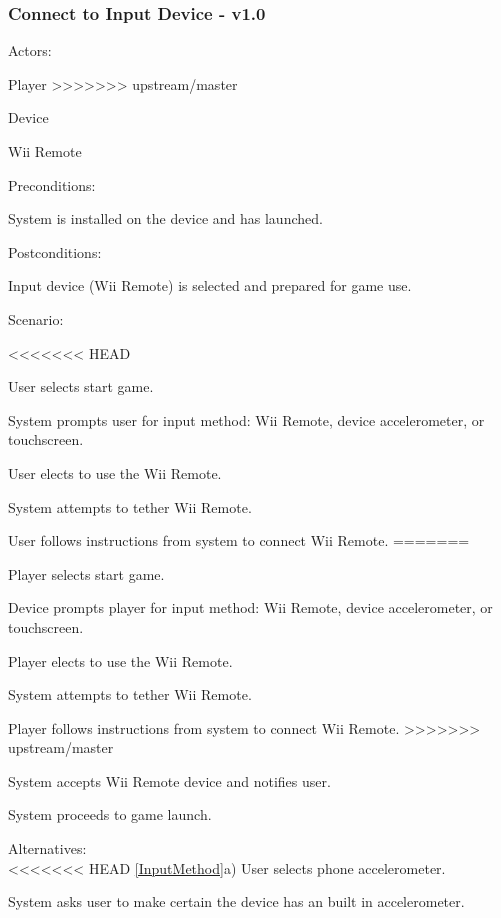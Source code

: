 \documentclass[12pt]{article}
\newenvironment{itemize*}%
  {\begin{itemize}%
  	\setlength{\parsep}{0pt}
    \setlength{\itemsep}{0pt}%
    \setlength{\parskip}{0pt}}%
  {\end{itemize}}
\newenvironment{enumerate*}%
  {\begin{enumerate}%
  	\setlength{\parsep}{0pt}
    \setlength{\itemsep}{0pt}%
    \setlength{\parskip}{0pt}}%
  {\end{enumerate}}
\begin{document}
\begin{itemize*}
\begin{itemize*}
\subsubsection*{Connect to Input Device - v1.0}
Actors:
\begin{itemize*}
\item Player
>>>>>>> upstream/master
\item Device 
\item Wii Remote
\end{itemize*}
Preconditions:
\begin{itemize*}
\item System is installed on the device and has launched.
\end{itemize*}
Postconditions:
\begin{itemize*}
\item Input device (Wii Remote) is selected and prepared for game use.
\end{itemize*}
Scenario:
\begin{enumerate*}
<<<<<<< HEAD
\item \label{BeginGame}User selects start game.
\item \label{InputMethod}System prompts user for input method: Wii Remote, device accelerometer, or touchscreen.
\item User elects to use the Wii Remote.
\item \label{ConnectWiimote}System attempts to tether Wii Remote.
\item User follows instructions from system to connect Wii Remote.
=======
\item \label{BeginGame}Player selects start game.
\item \label{InputMethod}Device prompts player for input method: Wii Remote, device accelerometer, or touchscreen.
\item Player elects to use the Wii Remote.
\item \label{ConnectWiimote}System attempts to tether Wii Remote.
\item Player follows instructions from system to connect Wii Remote.
>>>>>>> upstream/master
\item System accepts Wii Remote device and notifies user.
\item System proceeds to game launch.
\end{enumerate*}
Alternatives:\\
<<<<<<< HEAD
\ref{InputMethod}a) User selects phone accelerometer.  
\begin{enumerate*}
\item System asks user to make certain the device has an built in accelerometer.

\end{enumerate*}
\end{itemize*}
\end{itemize*}
\end{document}
